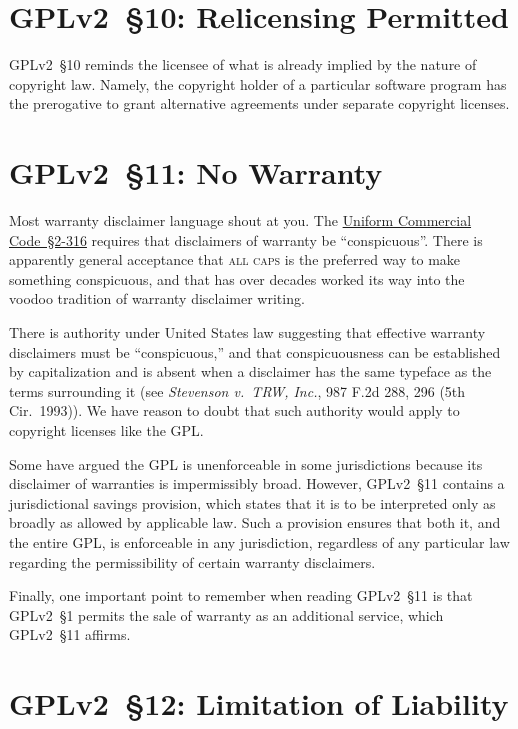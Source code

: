 \section{GPLv2~\S10: Relicensing Permitted}
\label{GPLv2s10}

GPLv2~\S10 reminds the licensee of what is already implied by the nature of
copyright law.  Namely, the copyright holder of a particular software
program has the prerogative to grant alternative agreements under separate
copyright licenses.

\section{GPLv2~\S11: No Warranty}
\label{GPLv2s11}

Most warranty disclaimer language shout at you.  The
\href{http://www.law.cornell.edu/ucc/2/2-316}{Uniform Commercial
  Code~\S2-316} requires that disclaimers of warranty be ``conspicuous''.
There is apparently general acceptance that \textsc{all caps} is the
preferred way to make something conspicuous, and that has over decades worked
its way into the voodoo tradition of warranty disclaimer writing.


There is authority under United States law suggesting that effective warranty
disclaimers must be ``conspicuous,'' and that conspicuousness can be
established by capitalization and is absent when a disclaimer has the same
typeface as the terms surrounding it (see \textit{Stevenson v.~TRW, Inc.},
987 F.2d 288, 296 (5th Cir.~1993)).  We have reason to doubt that such
authority would apply to copyright licenses like the GPL.

Some have argued the GPL is unenforceable in some jurisdictions because
its disclaimer of warranties is impermissibly broad.  However, GPLv2~\S11
contains a jurisdictional savings provision, which states that it is to be
interpreted only as broadly as allowed by applicable law.  Such a
provision ensures that both it, and the entire GPL, is enforceable in any
jurisdiction, regardless of any particular law regarding the
permissibility of certain warranty disclaimers.

Finally, one important point to remember when reading GPLv2~\S11 is that GPLv2~\S1
permits the sale of warranty as an additional service, which GPLv2~\S11 affirms.

\section{GPLv2~\S12: Limitation of Liability}
\label{GPLv2s12}


